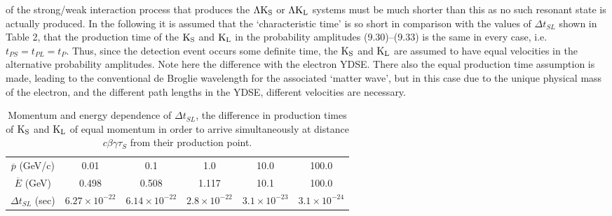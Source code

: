 {   of the strong/weak interaction process that produces the $\Lambda {\rm K_S}$ or $\Lambda {\rm K_L}$
    systems must be much shorter than this as no such resonant state is actually produced. In the following 
   it is assumed that the `characteristic time' is so short in comparison with the values of $\Delta t_{SL}$
   shown in Table 2, that the production time of the ${\rm K_S}$ and ${\rm K_L}$ in the probability amplitudes
   (9.30)--(9.33) is the same in every case, i.e. $t_{PS} = t_{PL} = t_P$. Thus, since the detection
   event occurs some definite time, the ${\rm K_S}$ and ${\rm K_L}$ are assumed to have equal velocities
   in the alternative probability amplitudes. Note here the
   difference with the electron YDSE. There also the equal production time assumption is made, leading
   to the conventional de Broglie wavelength for the associated `matter wave', but in this case due to the 
   unique physical mass of the electron, and the different path lengths in the YDSE, different velocities are necessary.
  
    \begin{table}
   \begin{center}
   \begin{tabular}{|c|c c c c c |} \hline  
     $\overline{p}$ (GeV/c)   & 0.01  & 0.1  &  1.0 & 10.0 & 100.0 \\
    $\overline{E}$ (GeV)   & 0.498  & 0.508 &  1.117 & 10.1 & 100.0 \\
    $\Delta t_{SL}$ (sec) & $6.27 \times 10^{-22}$  & $6.14 \times 10^{-22}$  & $2.8 \times 10^{-22}$ &  $3.1 \times 10^{-23}$
   & $3.1 \times 10^{-24}$   \\             
  \hline
  \end{tabular}
   \caption[] { Momentum and energy dependence of $\Delta t_{SL}$,
  the difference in production times of ${\rm K_S}$ and ${\rm K_L}$ of
   equal momentum in order
 to arrive simultaneously at distance  $c \beta \gamma \tau_S$  from their
   production point.} 
  \end{center}
  \end{table}  
   
}
